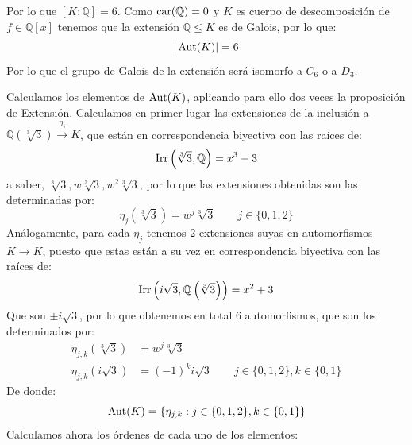 \begin{ejercicio}
\begin{enumerate}
\begin{itemize}
            \end{itemize}
            Por lo que $[K:\mathbb{Q}] = 6$. Como $\operatorname{car}(\mathbb{Q}) = 0$ y $K$ es cuerpo de descomposición de $f\in \mathbb{Q}[x]$ tenemos que la extensión $\mathbb{Q}\leq K$ es de Galois, por lo que:
            \begin{equation*}
                |\operatorname{Aut}(K)| = 6
            \end{equation*}
            Por lo que el grupo de Galois de la extensión será isomorfo a $C_6$ o a $D_3$.

            \noindent
            Calculamos los elementos de $\operatorname{Aut}(K)$, aplicando para ello dos veces la proposición de Extensión. Calculamos en primer lugar las extensiones de la inclusión a $\mathbb{Q}\left(\sqrt[3]{3}\right)\stackrel{\eta_j}{\to} K$, que están en correspondencia biyectiva con las raíces de:
            \begin{equation*}
                \operatorname{Irr}\left(\sqrt[3]{3},\mathbb{Q}\right) = x^3-3
            \end{equation*}
            a saber, $\sqrt[3]{3},w\sqrt[3]{3},w^2\sqrt[3]{3}$, por lo que las extensiones obtenidas son las determinadas por:
            \begin{equation*}
                \eta_j\left(\sqrt[3]{3}\right) = w^j \sqrt[3]{3} \qquad j \in \{0,1,2\}
            \end{equation*}
            Análogamente, para cada $\eta_j$ tenemos 2 extensiones suyas en automorfismos $K\to K$, puesto que estas están a su vez en correspondencia biyectiva con las raíces de:
            \begin{equation*}
                \operatorname{Irr}\left(i\sqrt{3},\mathbb{Q}\left(\sqrt[3]{3}\right)\right) = x^2+3
            \end{equation*}
            Que son $\pm i\sqrt{3}$, por lo que obtenemos en total 6 automorfismos, que son los determinados por:
            \begin{align*}
                \eta_{j,k}\left(\sqrt[3]{3}\right) &= w^j \sqrt[3]{3} \\
                \eta_{j,k}\left(i\sqrt{3}\right) &= {(-1)}^{k}i\sqrt{3} \qquad j\in \{0,1,2\}, k\in \{0,1\}
            \end{align*}
            De donde:
            \begin{equation*}
                \operatorname{Aut}(K) = \{\eta_{j,k}:j\in \{0,1,2\}, k\in \{0,1\}\}
            \end{equation*}
            Calculamos ahora los órdenes de cada uno de los elementos:

\end{enumerate}
\end{ejercicio}
